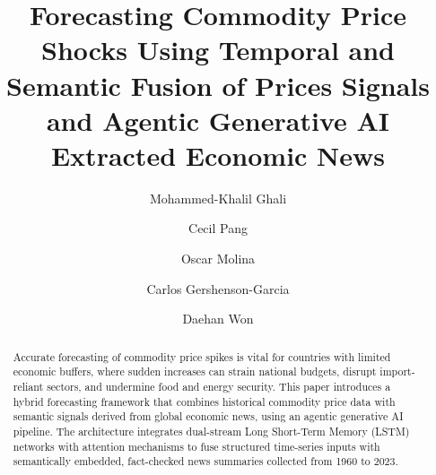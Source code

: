 \documentclass[12pt]{elsarticle}
\begin{document}
\begin{frontmatter}



\title{Forecasting Commodity Price Shocks Using Temporal and Semantic Fusion of Prices Signals and Agentic Generative AI Extracted Economic News}


\author[label1]{Mohammed-Khalil Ghali} %
\author[label1]{Cecil Pang} %
\author[label1]{Oscar Molina}
\author[label1]{Carlos Gershenson-Garcia}
\author[label1]{Daehan Won} %



            

\begin{abstract}
Accurate forecasting of commodity price spikes is vital for countries with limited economic buffers, where sudden increases can strain national budgets, disrupt import-reliant sectors, and undermine food and energy security. This paper introduces a hybrid forecasting framework that combines historical commodity price data with semantic signals derived from global economic news, using an agentic generative AI pipeline. The architecture integrates dual-stream Long Short-Term Memory (LSTM) networks with attention mechanisms to fuse structured time-series inputs with semantically embedded, fact-checked news summaries collected from 1960 to 2023.


\end{abstract}
\end{frontmatter}
\end{document}

